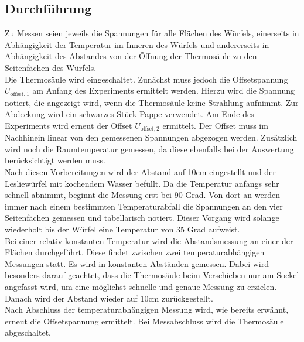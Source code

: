 \subsection{Durchführung}
Zu Messen seien jeweils die Spannungen für alle Flächen des Würfels, einerseits in Abhängigkeit der Temperatur im Inneren des Würfels und andererseits in Abhängigkeit des Abstandes von der Öffnung der Thermosäule zu den Seitenfächen des Würfels. \\
Die Thermosäule wird eingeschaltet.
Zunächst muss jedoch die Offsetspannung $U_{\text{offset},1}$ am Anfang des Experiments ermittelt werden.
Hierzu wird die Spannung notiert, die angezeigt wird, wenn die Thermosäule keine Strahlung aufnimmt.
Zur Abdeckung wird ein schwarzes Stück Pappe verwendet.
Am Ende des Experiments wird erneut der Offset $U_{\text{offset},2}$ ermittelt.
Der Offset muss im Nachhinein linear von den gemessenen Spannungen abgezogen werden.
Zusätzlich wird noch die Raumtemperatur gemessen, da diese ebenfalls bei der Auswertung berücksichtigt werden muss. \\
Nach diesen Vorbereitungen wird der Abstand auf 10cm eingestellt und der Lesliewürfel mit kochendem Wasser befüllt.
Da die Temperatur anfangs sehr schnell abnimmt, beginnt die Messung erst bei 90 Grad.
Von dort an werden immer nach einem bestimmten Temperaturabfall die Spannungen an den vier Seitenfächen gemessen und tabellarisch notiert.
Dieser Vorgang wird solange wiederholt bis der Würfel eine Temperatur von 35 Grad aufweist. \\
Bei einer relativ konstanten Temperatur wird die Abstandsmessung an einer der Flächen durchgeführt.
Diese findet zwischen zwei temperaturabhängigen Messungen statt.
Es wird in konstanten Abständen gemessen.
Dabei wird besonders darauf geachtet, dass die Thermosäule beim Verschieben nur am Sockel angefasst wird, um eine möglichst schnelle und genaue Messung zu erzielen.
Danach wird der Abstand wieder auf 10cm zurückgestellt.\\
Nach Abschluss der temperaturabhängigen Messung wird, wie bereits erwähnt, erneut die Offsetspannung ermittelt.
Bei Messabschluss wird die Thermosäule abgeschaltet.
